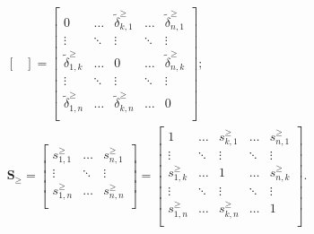 \documentclass{elsarticle} %
\begin{document}
\begin{gather}
\begin{bmatrix}
    \end{bmatrix} =
    \begin{bmatrix}
        0                           & \hdots & \tilde{\delta}_{k,1}^{\geq} & \hdots & \tilde{\delta}_{n,1}^{\geq} \\
        \vdots                      & \ddots & \vdots                      & \ddots & \vdots                      \\
        \tilde{\delta}_{1,k}^{\geq} & \hdots & 0                           & \hdots & \tilde{\delta}_{n,k}^{\geq} \\
        \vdots                      & \ddots & \vdots                      & \ddots & \vdots                      \\
        \tilde{\delta}_{1,n}^{\geq} & \hdots & \tilde{\delta}_{k,n}^{\geq} & \hdots & 0                           \\
    \end{bmatrix}
    ;\\
    \textbf{S}_{\boldsymbol{\geq}} =
    \begin{bmatrix}
        s_{1,1}^{\geq} & \hdots & s_{n,1}^{\geq} \\
        \vdots         & \ddots & \vdots         \\
        s_{1,n}^{\geq} & \hdots & s_{n,n}^{\geq} \\
    \end{bmatrix} =
    \begin{bmatrix}
        1              & \hdots & s_{k,1}^{\geq} & \hdots & s_{n,1}^{\geq} \\
        \vdots         & \ddots & \vdots         & \ddots & \vdots         \\
        s_{1,k}^{\geq} & \hdots & 1              & \hdots & s_{n,k}^{\geq} \\
        \vdots         & \ddots & \vdots         & \ddots & \vdots         \\
        s_{1,n}^{\geq} & \hdots & s_{k,n}^{\geq} & \hdots & 1              \\
    \end{bmatrix}
    .
\end{gather}

\end{document}
